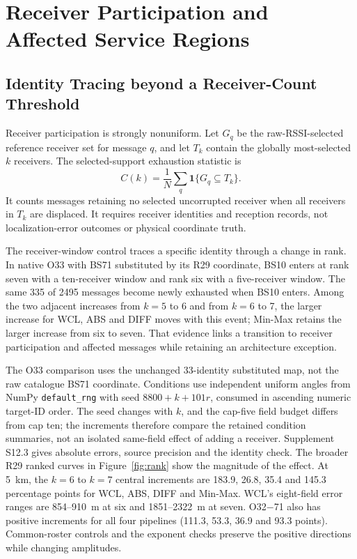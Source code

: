 \documentclass[11pt,a4paper]{article}
\begin{document}
\FloatBarrier
\section{Receiver Participation and Affected Service Regions}\label{sec:participation}
\subsection{Identity Tracing beyond a Receiver-Count Threshold}\label{sec:identity}
Receiver participation is strongly nonuniform. Let $G_q$ be the raw-RSSI-selected reference receiver set for message $q$, and let $T_k$ contain the globally most-selected $k$ receivers. The selected-support exhaustion statistic is
\begin{equation}C(k)=\frac1N\sum_q\mathbf1\{G_q\subseteq T_k\}.\label{eq:exhaustion}\end{equation}
It counts messages retaining no selected uncorrupted receiver when all receivers in $T_k$ are displaced. It requires receiver identities and reception records, not localization-error outcomes or physical coordinate truth.

The receiver-window control traces a specific identity through a change in rank. In native O33 with BS71 substituted by its R29 coordinate, BS10 enters at rank seven with a ten-receiver window and rank six with a five-receiver window. The same 335 of 2495 messages become newly exhausted when BS10 enters. Among the two adjacent increases from $k=5$ to 6 and from $k=6$ to 7, the larger increase for WCL, ABS and DIFF moves with this event; Min-Max retains the larger increase from six to seven. That evidence links a transition to receiver participation and affected messages while retaining an architecture exception.


The O33 comparison uses the unchanged 33-identity substituted map, not the raw catalogue BS71 coordinate. Conditions use independent uniform angles from NumPy \texttt{default\_rng} with seed $8800+k+101r$, consumed in ascending numeric target-ID order. The seed changes with $k$, and the cap-five field budget differs from cap ten; the increments therefore compare the retained condition summaries, not an isolated same-field effect of adding a receiver. Supplement S12.3 gives absolute errors, source precision and the identity check.
The broader R29 ranked curves in Figure~\ref{fig:rank} show the magnitude of the effect. At 5~km, the $k=6$ to $k=7$ central increments are 183.9, 26.8, 35.4 and 145.3 percentage points for WCL, ABS, DIFF and Min-Max. WCL's eight-field error ranges are 854--910~m at six and 1851--2322~m at seven. O32$-$71 also has positive increments for all four pipelines (111.3, 53.3, 36.9 and 93.3 points). Common-roster controls and the exponent checks preserve the positive directions while changing amplitudes.
\end{document}
